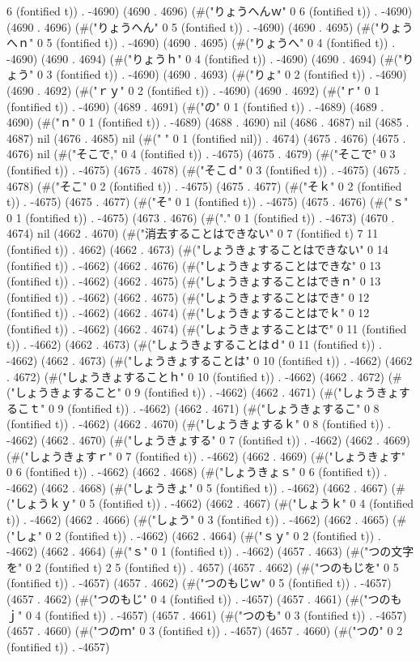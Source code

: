 6 (fontified t)) . -4690) (4690 . 4696) (#("りょうへんｗ" 0 6 (fontified t)) . -4690) (4690 . 4696) (#("りょうへん" 0 5 (fontified t)) . -4690) (4690 . 4695) (#("りょうへｎ" 0 5 (fontified t)) . -4690) (4690 . 4695) (#("りょうへ" 0 4 (fontified t)) . -4690) (4690 . 4694) (#("りょうｈ" 0 4 (fontified t)) . -4690) (4690 . 4694) (#("りょう" 0 3 (fontified t)) . -4690) (4690 . 4693) (#("りょ" 0 2 (fontified t)) . -4690) (4690 . 4692) (#("ｒｙ" 0 2 (fontified t)) . -4690) (4690 . 4692) (#("ｒ" 0 1 (fontified t)) . -4690) (4689 . 4691) (#("の" 0 1 (fontified t)) . -4689) (4689 . 4690) (#("ｎ" 0 1 (fontified t)) . -4689) (4688 . 4690) nil (4686 . 4687) nil (4685 . 4687) nil (4676 . 4685) nil (#(" " 0 1 (fontified nil)) . 4674) (4675 . 4676) (4675 . 4676) nil (#("そこで," 0 4 (fontified t)) . -4675) (4675 . 4679) (#("そこで" 0 3 (fontified t)) . -4675) (4675 . 4678) (#("そこｄ" 0 3 (fontified t)) . -4675) (4675 . 4678) (#("そこ" 0 2 (fontified t)) . -4675) (4675 . 4677) (#("そｋ" 0 2 (fontified t)) . -4675) (4675 . 4677) (#("そ" 0 1 (fontified t)) . -4675) (4675 . 4676) (#("ｓ" 0 1 (fontified t)) . -4675) (4673 . 4676) (#("." 0 1 (fontified t)) . -4673) (4670 . 4674) nil (4662 . 4670) (#("消去することはできない" 0 7 (fontified t) 7 11 (fontified t)) . 4662) (4662 . 4673) (#("しょうきょすることはできない" 0 14 (fontified t)) . -4662) (4662 . 4676) (#("しょうきょすることはできな" 0 13 (fontified t)) . -4662) (4662 . 4675) (#("しょうきょすることはできｎ" 0 13 (fontified t)) . -4662) (4662 . 4675) (#("しょうきょすることはでき" 0 12 (fontified t)) . -4662) (4662 . 4674) (#("しょうきょすることはでｋ" 0 12 (fontified t)) . -4662) (4662 . 4674) (#("しょうきょすることはで" 0 11 (fontified t)) . -4662) (4662 . 4673) (#("しょうきょすることはｄ" 0 11 (fontified t)) . -4662) (4662 . 4673) (#("しょうきょすることは" 0 10 (fontified t)) . -4662) (4662 . 4672) (#("しょうきょすることｈ" 0 10 (fontified t)) . -4662) (4662 . 4672) (#("しょうきょすること" 0 9 (fontified t)) . -4662) (4662 . 4671) (#("しょうきょするこｔ" 0 9 (fontified t)) . -4662) (4662 . 4671) (#("しょうきょするこ" 0 8 (fontified t)) . -4662) (4662 . 4670) (#("しょうきょするｋ" 0 8 (fontified t)) . -4662) (4662 . 4670) (#("しょうきょする" 0 7 (fontified t)) . -4662) (4662 . 4669) (#("しょうきょすｒ" 0 7 (fontified t)) . -4662) (4662 . 4669) (#("しょうきょす" 0 6 (fontified t)) . -4662) (4662 . 4668) (#("しょうきょｓ" 0 6 (fontified t)) . -4662) (4662 . 4668) (#("しょうきょ" 0 5 (fontified t)) . -4662) (4662 . 4667) (#("しょうｋｙ" 0 5 (fontified t)) . -4662) (4662 . 4667) (#("しょうｋ" 0 4 (fontified t)) . -4662) (4662 . 4666) (#("しょう" 0 3 (fontified t)) . -4662) (4662 . 4665) (#("しょ" 0 2 (fontified t)) . -4662) (4662 . 4664) (#("ｓｙ" 0 2 (fontified t)) . -4662) (4662 . 4664) (#("ｓ" 0 1 (fontified t)) . -4662) (4657 . 4663) (#("つの文字を" 0 2 (fontified t) 2 5 (fontified t)) . 4657) (4657 . 4662) (#("つのもじを" 0 5 (fontified t)) . -4657) (4657 . 4662) (#("つのもじｗ" 0 5 (fontified t)) . -4657) (4657 . 4662) (#("つのもじ" 0 4 (fontified t)) . -4657) (4657 . 4661) (#("つのもｊ" 0 4 (fontified t)) . -4657) (4657 . 4661) (#("つのも" 0 3 (fontified t)) . -4657) (4657 . 4660) (#("つのｍ" 0 3 (fontified t)) . -4657) (4657 . 4660) (#("つの" 0 2 (fontified t)) . -4657) 